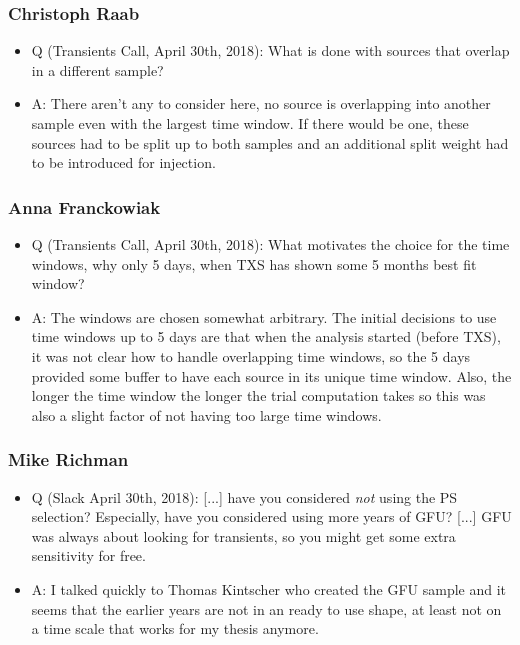 \subsubsection*{Christoph Raab}
  \begin{itemize}
      \item Q (Transients Call, April 30th, 2018):
        What is done with sources that overlap in a different sample?
      \item A:
        There aren't any to consider here, no source is overlapping into another sample even with the largest time window.
        If there would be one, these sources had to be split up to both samples and an additional split weight had to be introduced for injection.
  \end{itemize}

\subsubsection*{Anna Franckowiak}
  \begin{itemize}
      \item Q (Transients Call, April 30th, 2018):
        What motivates the choice for the time windows, why only 5 days, when TXS has shown some 5 months best fit window?
      \item A:
        The windows are chosen somewhat arbitrary.
        The initial decisions to use time windows up to 5 days are that when the analysis started (before TXS), it was not clear how to handle overlapping time windows, so the 5 days provided some buffer to have each source in its unique time window.
        Also, the longer the time window the longer the trial computation takes so this was also a slight factor of not having too large time windows.
  \end{itemize}

\subsubsection*{Mike Richman}
  \begin{itemize}
      \item Q (Slack April 30th, 2018):
        [...] have you considered \emph{not} using the PS selection? Especially, have you considered using more years of GFU?
        [...] GFU was always about looking for transients, so you might get some extra sensitivity for free.
      \item A:
        I talked quickly to Thomas Kintscher who created the GFU sample and it seems that the earlier years are not in an ready to use shape, at least not on a time scale that works for my thesis anymore.
  \end{itemize}



